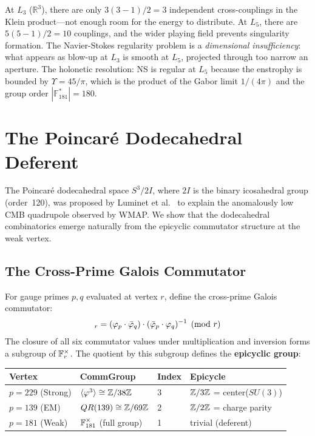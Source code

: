 \begin{remark}
At $L_3$ ($\mathbb{R}^3$), there are only $3(3-1)/2 = 3$ independent cross-couplings in the Klein product---not enough room for the energy to distribute. At $L_5$, there are $5(5-1)/2 = 10$ couplings, and the wider playing field prevents singularity formation. The Navier-Stokes regularity problem is a \emph{dimensional insufficiency}: what appears as blow-up at $L_3$ is smooth at $L_5$, projected through too narrow an aperture. The holonetic resolution: NS is regular at $L_5$ because the enstrophy is bounded by $\Upsilon = 45/\pi$, which is the product of the Gabor limit $1/(4\pi)$ and the group order $|\mathbb{F}_{181}^*| = 180$.
\end{remark}

\section{The Poincar\'{e} Dodecahedral Deferent}

The Poincar\'{e} dodecahedral space $S^3 / 2I$, where $2I$ is the binary icosahedral group (order~120), was proposed by Luminet et al.~\cite{luminet2003} to explain the anomalously low CMB quadrupole observed by WMAP. We show that the dodecahedral combinatorics emerge naturally from the epicyclic commutator structure at the weak vertex.

\subsection{The Cross-Prime Galois Commutator}

For gauge primes $p, q$ evaluated at vertex $r$, define the cross-prime Galois commutator:
\begin{equation}
    [p,q]_r = (\vp_p \cdot \vpbar_q) \cdot (\vpbar_p \cdot \vp_q)^{-1} \pmod{r}
\end{equation}
The closure of all six commutator values under multiplication and inversion forms a subgroup of $\mathbb{F}_r^{\times}$. The quotient by this subgroup defines the \textbf{epicyclic group}:

\begin{center}
\begin{tabular}{llll}
\hline
Vertex & CommGroup & Index & Epicycle \\
\hline
$p=229$ (Strong) & $\langle \varphi^3 \rangle \cong \mathbb{Z}/38\mathbb{Z}$ & 3 & $\mathbb{Z}/3\mathbb{Z}$ = center($SU(3)$) \\
$p=139$ (EM) & $QR(139) \cong \mathbb{Z}/69\mathbb{Z}$ & 2 & $\mathbb{Z}/2\mathbb{Z}$ = charge parity \\
$p=181$ (Weak) & $\mathbb{F}_{181}^{\times}$ (full group) & 1 & trivial (deferent) \\
\hline
\end{tabular}
\end{center}

